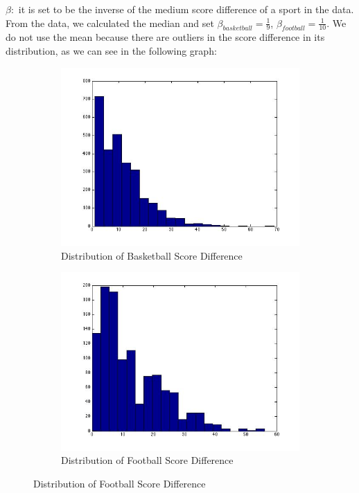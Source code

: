 \documentclass[titlepage]{article}
\begin{document}
\noindent $\beta:$ it is set to be the inverse of the medium score difference of a sport in the data. From the data, we calculated the median and set $\beta_{basketball} = \frac{1}{9}$, $\beta_{football} = \frac{1}{10}$. We do not use the mean because there are outliers in the score difference in its distribution, as we can see in the following graph:
\\

\begin{figure}[H]
      \centering
      \begin{subfigure}{0.48\textwidth}
      \caption{Distribution of Basketball Score Difference}
      \centering
      \includegraphics[width=1.1\textwidth]{graphs/basketball_diff_dist.jpg}
      \end{subfigure}\quad
      \begin{subfigure}{0.48\textwidth}
      \caption{Distribution of Football Score Difference}
      \centering
      \includegraphics[width=1.1\textwidth]{graphs/football_diff_dist.jpg}
      \end{subfigure}
 \end{figure}
\end{document}
